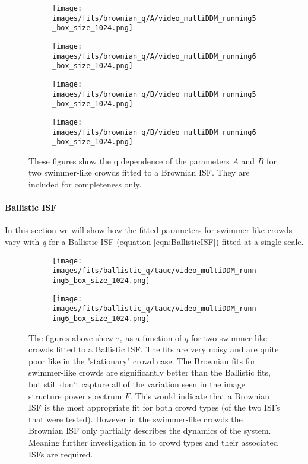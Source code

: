\documentclass[10pt]{article}
\begin{document}
\begin{figure}[H]
\begin{subfigure}[t]{.5\textwidth}
  \centering
  \texttt{[image: images/fits/brownian\_q/A/video\_multiDDM\_running5\_box\_size\_1024.png]}
  \caption{}
\end{subfigure}%
\hfill
\begin{subfigure}[t]{.5\textwidth}
  \centering
  \texttt{[image: images/fits/brownian\_q/A/video\_multiDDM\_running6\_box\_size\_1024.png]}
  \caption{}
\end{subfigure}
\label{fig:running_brownian_fits_A}
\par\bigskip
\begin{subfigure}[t]{.5\textwidth}
  \centering
  \texttt{[image: images/fits/brownian\_q/B/video\_multiDDM\_running5\_box\_size\_1024.png]}
  \caption{}
\end{subfigure}%
\hfill
\begin{subfigure}[t]{.5\textwidth}
  \centering
  \texttt{[image: images/fits/brownian\_q/B/video\_multiDDM\_running6\_box\_size\_1024.png]}
  \caption{}
\end{subfigure}
\caption{These figures show the q dependence of the parameters $A$ and $B$ for two swimmer-like crowds fitted to a Brownian ISF. They are included for completeness only.}
\label{fig:running_brownian_fits_B}
\end{figure}


\clearpage
\paragraph{Ballistic ISF}

In this section we will show how the fitted parameters for swimmer-like crowds vary with \textit{q} for a Ballistic ISF (equation \ref{eqn:BallisticISF}) fitted at a single-scale.
\begin{figure}[H]
\begin{subfigure}[t]{.5\textwidth}
  \centering
  \texttt{[image: images/fits/ballistic\_q/tauc/video\_multiDDM\_running5\_box\_size\_1024.png]}
  \caption{}
\end{subfigure}%
\hfill
\begin{subfigure}[t]{.5\textwidth}
  \centering
  \texttt{[image: images/fits/ballistic\_q/tauc/video\_multiDDM\_running6\_box\_size\_1024.png]}
  \caption{}
\end{subfigure}
\caption{The figures above show $\tau_c$ as a function of $q$ for two swimmer-like crowds fitted to a Ballistic ISF. The fits are very noisy and are quite poor like in the "stationary" crowd case. The Brownian fits for swimmer-like crowds are significantly better than the Ballistic fits, but still don't capture all of the variation seen in the image structure power spectrum $F$. This would indicate that a Brownian ISF is the most appropriate fit for both crowd types (of the two ISFs that were tested). However in the swimmer-like crowds the Brownian ISF only partially describes the dynamics of the system. Meaning further investigation in to crowd types and their associated ISFs are required.}
\label{fig:running_ballistic_fits_tauc}
\end{figure}
\end{document}
